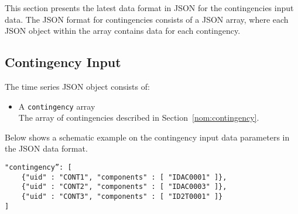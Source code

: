 \label{sec:contingency}
This section presents the latest data format in JSON for the contingencies input data.
The JSON format for contingencies consists of a JSON array,
where each JSON object within the array contains data for each contingency.

\subsection{Contingency Input}
\label{sec:input_data}
The time series JSON object consists of:
\begin{itemize}
    \item A \texttt{contingency} array\\
        The array of contingencies described in Section~\ref{nom:contingency}.
\end{itemize}


Below shows a schematic example on the contingency input data parameters in the JSON data format.
\begin{verbatim}
"contingency”: [
    {"uid" : "CONT1", "components" : [ "IDAC0001" ]},
    {"uid" : "CONT2", "components" : [ "IDAC0003" ]},
    {"uid" : "CONT3", "components" : [ "ID2T0001" ]}
]
\end{verbatim}

